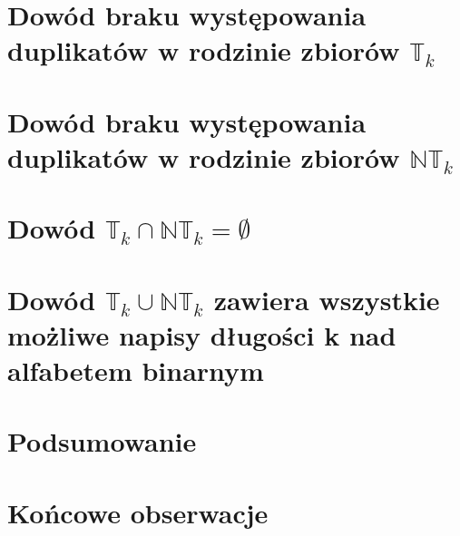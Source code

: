 \documentclass{article}
\begin{document}
\section{Dowód braku występowania duplikatów w rodzinie zbiorów $\mathbb{T}_k$}



\section{Dowód braku występowania duplikatów w rodzinie zbiorów $\mathbb{NT}_k$}




\section{Dowód $\mathbb{T}_k \cap \mathbb{NT}_k = \emptyset$}



\section{Dowód $\mathbb{T}_k \cup \mathbb{NT}_k$ zawiera wszystkie możliwe napisy długości k nad alfabetem binarnym}



\section{Podsumowanie}



\section{Końcowe obserwacje}


\end{document}
